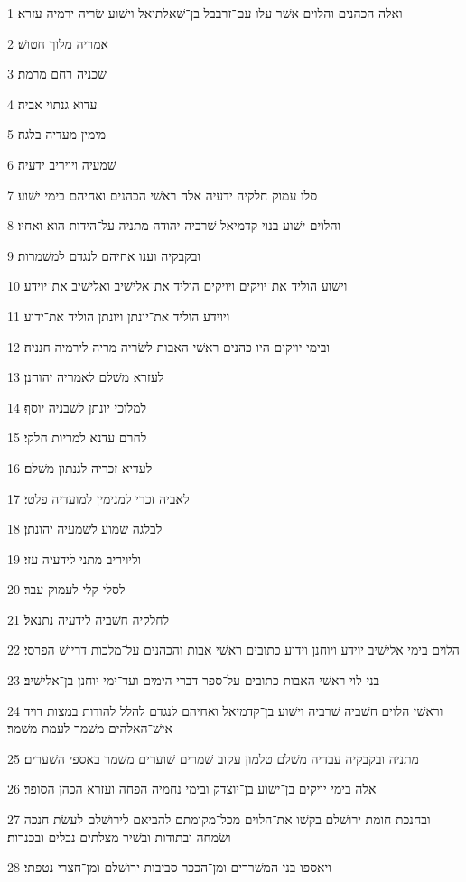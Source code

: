\par 1 ואלה הכהנים והלוים אשׁר עלו עם־זרבבל בן־שׁאלתיאל וישׁוע שׂריה ירמיה עזרא׃
\par 2 אמריה מלוך חטושׁ׃
\par 3 שׁכניה רחם מרמת׃
\par 4 עדוא גנתוי אביה׃
\par 5 מימין מעדיה בלגה׃
\par 6 שׁמעיה ויויריב ידעיה׃
\par 7 סלו עמוק חלקיה ידעיה אלה ראשׁי הכהנים ואחיהם בימי ישׁוע׃
\par 8 והלוים ישׁוע בנוי קדמיאל שׁרביה יהודה מתניה על־הידות הוא ואחיו׃
\par 9 ובקבקיה וענו אחיהם לנגדם למשׁמרות׃
\par 10 וישׁוע הוליד את־יויקים ויויקים הוליד את־אלישׁיב ואלישׁיב את־יוידע׃
\par 11 ויוידע הוליד את־יונתן ויונתן הוליד את־ידוע׃
\par 12 ובימי יויקים היו כהנים ראשׁי האבות לשׂריה מריה לירמיה חנניה׃
\par 13 לעזרא משׁלם לאמריה יהוחנן׃
\par 14 למלוכי יונתן לשׁבניה יוסף׃
\par 15 לחרם עדנא למריות חלקי׃
\par 16 לעדיא זכריה לגנתון משׁלם׃
\par 17 לאביה זכרי למנימין למועדיה פלטי׃
\par 18 לבלגה שׁמוע לשׁמעיה יהונתן׃
\par 19 וליויריב מתני לידעיה עזי׃
\par 20 לסלי קלי לעמוק עבר׃
\par 21 לחלקיה חשׁביה לידעיה נתנאל׃
\par 22 הלוים בימי אלישׁיב יוידע ויוחנן וידוע כתובים ראשׁי אבות והכהנים על־מלכות דריושׁ הפרסי׃
\par 23 בני לוי ראשׁי האבות כתובים על־ספר דברי הימים ועד־ימי יוחנן בן־אלישׁיב׃
\par 24 וראשׁי הלוים חשׁביה שׁרביה וישׁוע בן־קדמיאל ואחיהם לנגדם להלל להודות במצות דויד אישׁ־האלהים משׁמר לעמת משׁמר׃
\par 25 מתניה ובקבקיה עבדיה משׁלם טלמון עקוב שׁמרים שׁוערים משׁמר באספי השׁערים׃
\par 26 אלה בימי יויקים בן־ישׁוע בן־יוצדק ובימי נחמיה הפחה ועזרא הכהן הסופר׃
\par 27 ובחנכת חומת ירושׁלם בקשׁו את־הלוים מכל־מקומתם להביאם לירושׁלם לעשׂת חנכה ושׂמחה ובתודות ובשׁיר מצלתים נבלים ובכנרות׃
\par 28 ויאספו בני המשׁררים ומן־הככר סביבות ירושׁלם ומן־חצרי נטפתי׃
